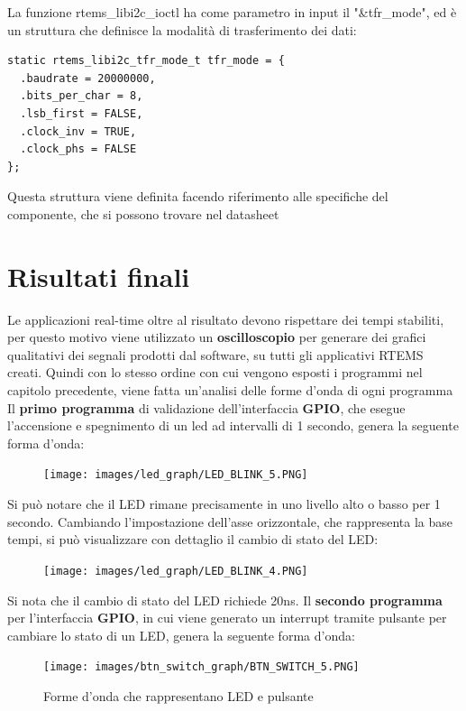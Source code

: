 \documentclass[12pt, a4paper, titlepage, oneside]{book}
\begin{document}
\newpage
La funzione rtems\_libi2c\_ioctl ha come parametro in input il  "\&tfr\_mode", ed è un struttura che definisce la modalità di trasferimento dei dati:
\begin{lstlisting}[style = CStyle]
static rtems_libi2c_tfr_mode_t tfr_mode = {
  .baudrate = 20000000,
  .bits_per_char = 8,
  .lsb_first = FALSE,
  .clock_inv = TRUE,
  .clock_phs = FALSE
};
\end{lstlisting}
Questa struttura viene definita facendo riferimento alle specifiche del componente, che si possono trovare nel datasheet \cite{microchipMCP4822}
\section{Risultati finali}

Le applicazioni real-time oltre al risultato devono rispettare dei tempi stabiliti, per questo motivo viene utilizzato un \textbf{oscilloscopio} per generare dei grafici qualitativi dei segnali prodotti dal software, su tutti gli applicativi RTEMS creati. Quindi con lo stesso ordine con cui vengono esposti i programmi nel capitolo precedente, viene fatta un'analisi delle forme d'onda di ogni programma\newline
Il \textbf{primo programma} di validazione dell'interfaccia \textbf{GPIO}, che esegue l'accensione e spegnimento di un led ad intervalli di 1 secondo, genera la seguente forma d'onda:\newline
\begin{figure}[h]
    \centering
    \texttt{[image: images/led\_graph/LED\_BLINK\_5.PNG]}
\end{figure}
\newpage 
Si può notare che il LED rimane precisamente in uno livello alto o basso per 1 secondo.\newline
Cambiando l'impostazione dell'asse orizzontale, che rappresenta la base tempi, si può visualizzare con dettaglio il cambio di stato del LED:
\begin{figure}[h]
    \centering
    \texttt{[image: images/led\_graph/LED\_BLINK\_4.PNG]}
\end{figure}
\newline
Si nota che il cambio di stato del LED richiede 20ns.\newline
Il \textbf{secondo programma} per l'interfaccia \textbf{GPIO}, in cui viene generato un interrupt tramite pulsante per cambiare lo stato di un LED, genera la seguente forma d'onda:\newline
\begin{figure}[h]
    \centering
    \texttt{[image: images/btn\_switch\_graph/BTN\_SWITCH\_5.PNG]}
    \caption{Forme d'onda che rappresentano LED e pulsante}
    \label{fig:btn_1}
\end{figure}
\end{document}
